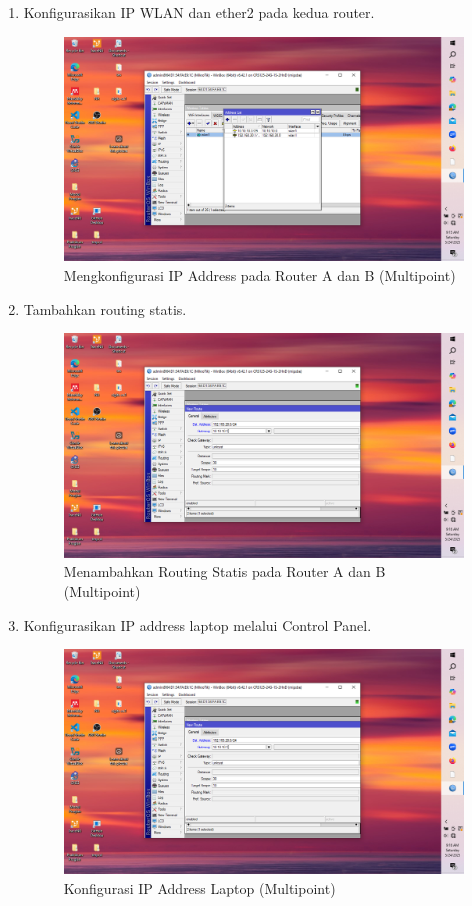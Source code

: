 \begin{enumerate}
    \item Konfigurasikan IP WLAN dan ether2 pada kedua router.
    \begin{figure}[H]
        \centering
        \includegraphics[width=0.5\linewidth]{gambar4.png}
        \caption{Mengkonfigurasi IP Address pada Router A dan B (Multipoint)}
        \label{fig:ip-router-multi}
    \end{figure}

    \item Tambahkan routing statis.
    \begin{figure}[H]
        \centering
        \includegraphics[width=0.5\linewidth]{gambar5.png}
        \caption{Menambahkan Routing Statis pada Router A dan B (Multipoint)}
        \label{fig:routing-multi}
    \end{figure}

    \item Konfigurasikan IP address laptop melalui Control Panel.
    \begin{figure}[H]
        \centering
        \includegraphics[width=0.5\linewidth]{gambar5.png}
        \caption{Konfigurasi IP Address Laptop (Multipoint)}
        \label{fig:ip-laptop-multi}
    \end{figure}


\end{enumerate}
